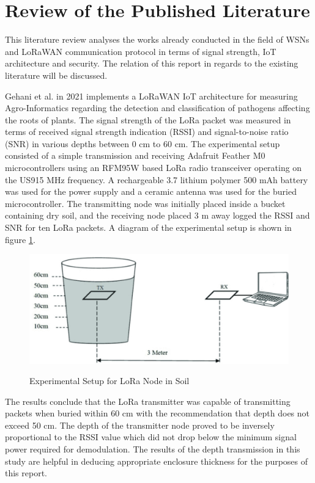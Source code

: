 \section{Review of the Published Literature}
This literature review analyses the works already conducted in the field of WSNs and LoRaWAN communication protocol in terms of signal strength, IoT architecture and security. The relation of this report in regards to the existing literature will be discussed. 

Gehani et al. in 2021 \cite{LoRa-Agro-Informatics} implements a LoRaWAN IoT architecture for measuring Agro-Informatics regarding the detection and classification of pathogens affecting the roots of plants. The signal strength of the LoRa packet was measured in terms of received signal strength indication (RSSI) and signal-to-noise ratio (SNR) in various depths between 0 cm to 60 cm. The experimental setup consisted of a simple transmission and receiving Adafruit Feather M0 microcontrollers using an RFM95W based LoRa radio transceiver operating on the US915 MHz frequency. A rechargeable 3.7 lithium polymer 500 mAh battery was used for the power supply and a ceramic antenna was used for the buried microcontroller. The transmitting node was initially placed inside a bucket containing dry soil, and the receiving node placed 3 m away logged the RSSI and SNR for ten LoRa packets. A diagram of the experimental setup is shown in figure \ref{lora-bucket}. 

\begin{figure}[h]
	\centering
	\caption{Experimental Setup for LoRa Node in Soil \cite{LoRa-Agro-Informatics}}
	\includegraphics[scale=0.5]{Sections/Literature-Review/Lora-bucket.pdf}
	\label{lora-bucket}
\end{figure}

The results conclude that the LoRa transmitter was capable of transmitting packets when buried within 60 cm with the recommendation that depth does not exceed 50 cm. The depth of the transmitter node proved to be inversely proportional to the RSSI value which did not drop below the minimum signal power required for demodulation. The results of the depth transmission in this study are helpful in deducing appropriate enclosure thickness for the purposes of this report.

